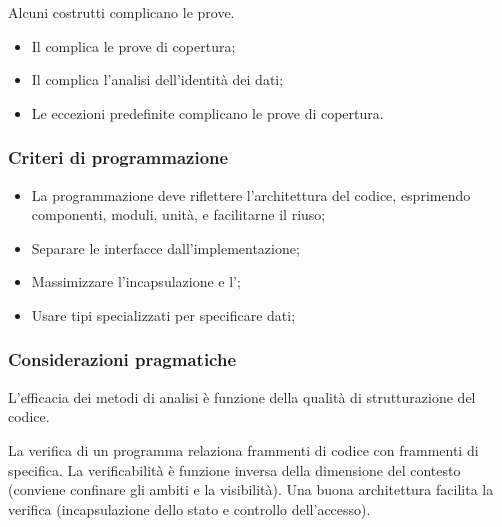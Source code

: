 Alcuni costrutti complicano le prove.

\begin{itemize}
  \item Il  complica le prove di copertura;
  \item Il  complica l'analisi dell'identità dei dati;
  \item Le eccezioni predefinite complicano le prove di copertura.
\end{itemize}

\subsubsection{Criteri di programmazione}
\label{ssub:criteri_di_programmazione}

\begin{itemize}
  \item La programmazione deve riflettere l'architettura del codice, esprimendo
  componenti, moduli, unità, e facilitarne il riuso;
  \item Separare le interfacce dall'implementazione;
  \item Massimizzare l'incapsulazione e l';
  \item Usare tipi specializzati per specificare dati;
\end{itemize}

\subsubsection{Considerazioni pragmatiche}
\label{ssub:considerazioni_pragmatiche}

L'efficacia dei metodi di analisi è funzione della qualità di strutturazione del
codice.

La verifica di un programma relaziona frammenti di codice con frammenti di
specifica. La verificabilità è funzione inversa della dimensione del contesto
(conviene confinare gli ambiti e la visibilità). Una buona architettura facilita
la verifica (incapsulazione dello stato e controllo dell'accesso).

